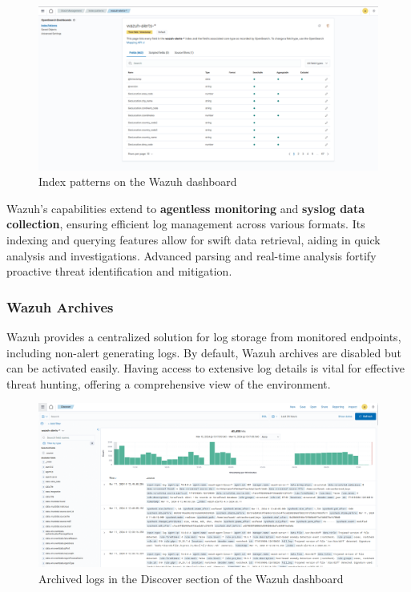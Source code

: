 \begin{figure}[H]
    \centering
    \includegraphics[width=\textwidth]{images/threat-hunting/wazuh-alerts-index-pattern.png}
    \caption{Index patterns on the Wazuh dashboard}
    \label{fig:wazuh-alerts-index-pattern}
\end{figure}

Wazuh's capabilities extend to \textbf{agentless monitoring} and \textbf{syslog data collection}, ensuring efficient log management across various formats. Its indexing and querying features allow for swift data retrieval, aiding in quick analysis and investigations. Advanced parsing and real-time analysis fortify proactive threat identification and mitigation.

\subsubsection{Wazuh Archives}

Wazuh provides a centralized solution for log storage from monitored endpoints, including non-alert generating logs. By default, Wazuh archives are disabled but can be activated easily. Having access to extensive log details is vital for effective threat hunting, offering a comprehensive view of the environment.

\begin{figure}[H]
    \centering
    \includegraphics[width=\textwidth]{images/threat-hunting/discover-archives-logs.png}
    \caption{Archived logs in the Discover section of the Wazuh dashboard}
    \label{fig:discover-archives-logs}
\end{figure}

